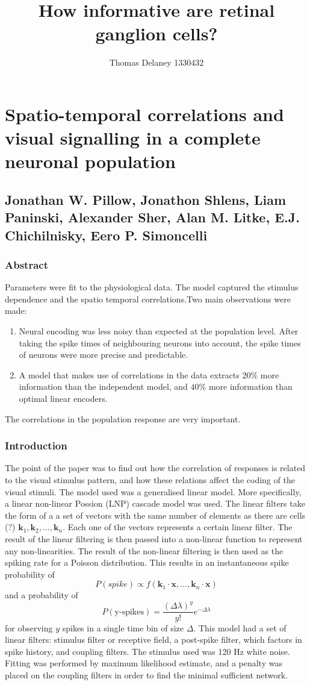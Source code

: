 \documentclass[a4paper,12pt]{article}
\title{How informative are retinal ganglion cells?}
\author{Thomas Delaney 1330432}
\theoremstyle{definition}
\begin{document}
\section*{Spatio-temporal correlations and visual signalling in a complete neuronal population}
\subsection*{Jonathan W. Pillow, Jonathon Shlens, Liam Paninski, Alexander Sher, Alan M. Litke, E.J. Chichilnisky, Eero P. Simoncelli}

\subsubsection*{Abstract}
	Parameters were fit to the physiological data. The model captured the stimulus dependence and the spatio temporal correlations.Two main observations were made: 
	\begin{enumerate}
		\item Neural encoding was less noisy than expected at the population level. After taking the spike times of neighbouring neurons into account, the spike times of neurons were more precise and predictable.
		\item A model that makes use of correlations in the data extracts $20\%$ more information than the independent model, and $40\%$ more information than optimal linear encoders.
	\end{enumerate}
	The correlations in the population response are very important.
	
\subsubsection*{Introduction}
	The point of the paper was to find out how the correlation of responses is related to the visual stimulus pattern, and how these relations affect the coding of the visual stimuli. The model used was a generalised linear model. More specifically, a linear non-linear Possion (LNP) cascade model was used. The linear filters take the form of a a set of vectors with the same number of elements as there are cells (?) $\mathbf{k}_1, \mathbf{k}_2, \dots , \mathbf{k}_n$. Each one of the vectors represents a certain linear filter. The result of the linear filtering is then passed into a non-linear function to represent any non-linearities. The result of the non-linear filtering is then used as the spiking rate for a Poisson distribution. This results in an instantaneous spike probability of
	\[
		P(spike) \propto f(\mathbf{k}_1 \cdot \mathbf{x}, \dots, \mathbf{k}_n \cdot \mathbf{x})
	\]
	and a probability of
	\[
		P(\text{y-spikes}) = \frac{(\Delta \lambda)^y}{y!} e^{-\Delta \lambda}
	\]
	for observing $y$ spikes in a single time bin of size $\Delta$. This model had a set of linear filters: stimulus filter or receptive field, a post-spike filter, which factors in spike history, and coupling filters. The stimulus used was 120 Hz white noise. Fitting was performed by maximum likelihood estimate, and a penalty was placed on the coupling filters in order to find the minimal sufficient network.
	
\end{document}
